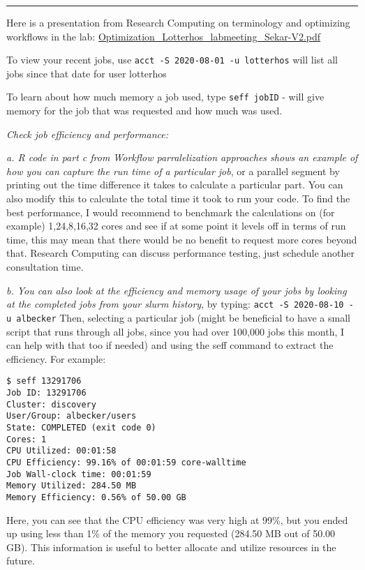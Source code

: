 \documentclass[
  letterpaper,
  DIV=11,
  numbers=noendperiod]{scrreprt}
\begin{document}
\begin{center}\rule{0.5\linewidth}{0.5pt}\end{center}

Here is a presentation from Research Computing on terminology and
optimizing workflows in the lab:
\href{https://drk-lo.github.io/lotterhoslabprotocols/img/Optimization_Lotterhos_labmeeting_Sekar-V2.pdf}{Optimization\_Lotterhos\_labmeeting\_Sekar-V2.pdf}

To view your recent jobs, use
\texttt{acct\ -S\ 2020-08-01\ -u\ lotterhos} will list all jobs since
that date for user lotterhos

To learn about how much memory a job used, type \texttt{seff\ jobID} -
will give memory for the job that was requested and how much was used.

\emph{Check job efficiency and performance:}

\emph{a. R code in part c from Workflow parralelization approaches shows
an example of how you can capture the run time of a particular job}, or
a parallel segment by printing out the time difference it takes to
calculate a particular part. You can also modify this to calculate the
total time it took to run your code. To find the best performance, I
would recommend to benchmark the calculations on (for example)
1,24,8,16,32 cores and see if at some point it levels off in terms of
run time, this may mean that there would be no benefit to request more
cores beyond that. Research Computing can discuss performance testing,
just schedule another consultation time.

\emph{b. You can also look at the efficiency and memory usage of your
jobs by looking at the completed jobs from your slurm history}, by
typing: \texttt{acct\ -S\ 2020-08-10\ -u\ albecker} Then, selecting a
particular job (might be beneficial to have a small script that runs
through all jobs, since you had over 100,000 jobs this month, I can help
with that too if needed) and using the seff command to extract the
efficiency. For example:

\begin{verbatim}
$ seff 13291706
Job ID: 13291706
Cluster: discovery
User/Group: albecker/users
State: COMPLETED (exit code 0)
Cores: 1
CPU Utilized: 00:01:58
CPU Efficiency: 99.16% of 00:01:59 core-walltime
Job Wall-clock time: 00:01:59
Memory Utilized: 284.50 MB
Memory Efficiency: 0.56% of 50.00 GB
\end{verbatim}

Here, you can see that the CPU efficiency was very high at 99\%, but you
ended up using less than 1\% of the memory you requested (284.50 MB out
of 50.00 GB). This information is useful to better allocate and utilize
resources in the future.
\end{document}
